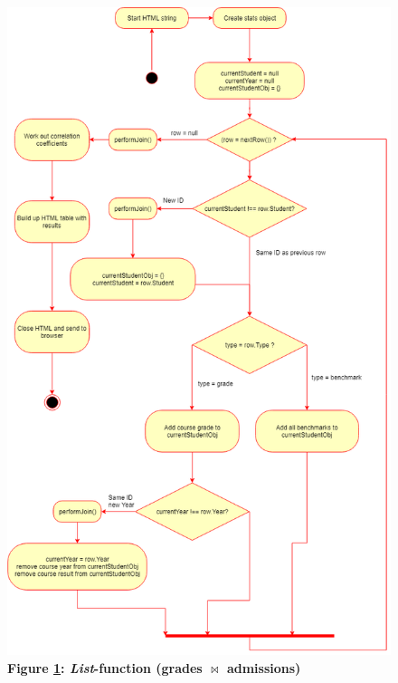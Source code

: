 \begin{figure}[H]
    \centering
    \begin{mdframed}
        \centering
        \includegraphics[scale=0.5]{./resources/figures/fig-listfn-correlation-grades.png}
    \end{mdframed}
    \caption[\textit{List}-function (\texorpdfstring{grades $\bowtie$ admissions}{Lg})]{\textbf{Figure \ref{fig-listfn-correlation-grades}: \textit{List}-function (\texorpdfstring{grades $\bowtie$ admissions}{Lg})}}
    \label{fig-listfn-correlation-grades}
\end{figure}
